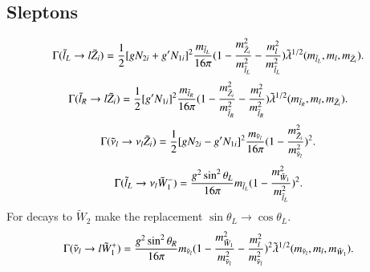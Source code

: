 \documentclass[final,3p,times]{elsarticle}
\begin{document}
\subsection{Sleptons} \label{Sleptons}
\begin{equation}\label{lLlneut}
\begin{aligned}
\Gamma (\tilde{l}_L \rightarrow l \tilde{Z}_i) = \frac{1}{2}[g N_{2i} + g' N_{1i}]^2 {m_{\tilde{l}_L} \over 16\pi} (1 - {m_{\tilde{Z}_i}^2 \over m_{\tilde{l}_L}^2} - {m_{l}^2 \over m_{\tilde{l}_L}^2}) \tilde{\lambda}^{1/2}(m_{\tilde{l}_L}, m_l, m_{\tilde{Z}_i}).
\end{aligned} 
\end{equation} 
\begin{equation}\label{lRlneut}
\begin{aligned}
\Gamma (\tilde{l}_R \rightarrow l \tilde{Z}_i) = \frac{1}{2}[g' N_{1i}]^2 {m_{\tilde{l}_R} \over 16\pi} (1 - {m_{\tilde{Z}_i}^2 \over m_{\tilde{l}_R}^2} - {m_{l}^2 \over m_{\tilde{l}_R}^2}) \tilde{\lambda}^{1/2}(m_{\tilde{l}_R}, m_l, m_{\tilde{Z}_i}).
\end{aligned}
\end{equation} 
\begin{equation}\label{snulnulneut}
\begin{aligned}
\Gamma (\tilde{\nu}_l \rightarrow \nu_l \tilde{Z}_i) = \frac{1}{2}[g N_{2i} - g' N_{1i}]^2 {m_{\tilde{\nu}_l} \over 16\pi} (1 - {m_{\tilde{Z}_i}^2 \over m_{\tilde{\nu}_l}^2} )^2.
\end{aligned}
\end{equation} 
\begin{equation}\label{lLnulch1}
\begin{aligned}
\Gamma (\tilde{l}_L \rightarrow \nu_l \tilde{W}_{1}^{-}) = {g^2 \sin^2 \theta_L \over 16\pi} m_{\tilde{l}_L} (1 - {m_{\tilde{W}_1}^2 \over m_{\tilde{l}_L}^2} )^2.
\end{aligned}
\end{equation} 
For decays to $\tilde{W}_2$ make the replacement $\sin\theta_L \rightarrow \cos\theta_L$.
\begin{equation}\label{nullch1}
\begin{aligned}
\Gamma (\tilde{\nu}_l \rightarrow l \tilde{W}_{1}^{+}) = {g^2 \sin^2 \theta_R \over 16\pi} m_{\tilde{\nu}_l} (1 - {m_{\tilde{W}_1}^2 \over m_{\tilde{\nu}_l}^2} - {m_{l}^2 \over m_{\tilde{\nu}_l}^2} )^2 \tilde{\lambda}^{1/2} (m_{\tilde{\nu}_l}, m_l, m_{\tilde{W}_1}).
\end{aligned}
\end{equation} 
\end{document}
